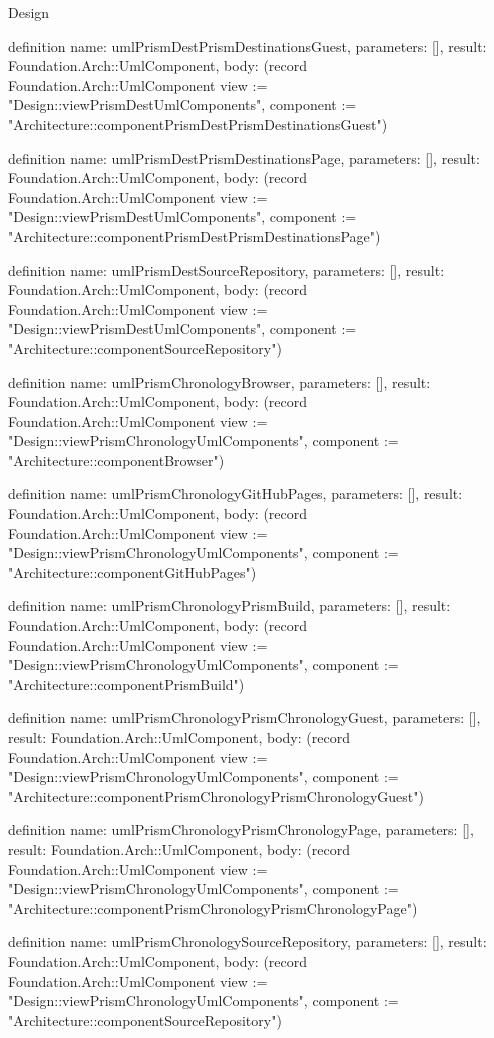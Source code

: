 \begin{lexlean}{Design}
\begin{semanticmodule}
definition{
  name: umlPrismDestPrismDestinationsGuest,
  parameters: [],
  result: Foundation.Arch::UmlComponent,
  body: (record Foundation.Arch::UmlComponent {view := "Design::viewPrismDestUmlComponents", component := "Architecture::componentPrismDestPrismDestinationsGuest"})
}

definition{
  name: umlPrismDestPrismDestinationsPage,
  parameters: [],
  result: Foundation.Arch::UmlComponent,
  body: (record Foundation.Arch::UmlComponent {view := "Design::viewPrismDestUmlComponents", component := "Architecture::componentPrismDestPrismDestinationsPage"})
}

definition{
  name: umlPrismDestSourceRepository,
  parameters: [],
  result: Foundation.Arch::UmlComponent,
  body: (record Foundation.Arch::UmlComponent {view := "Design::viewPrismDestUmlComponents", component := "Architecture::componentSourceRepository"})
}

definition{
  name: umlPrismChronologyBrowser,
  parameters: [],
  result: Foundation.Arch::UmlComponent,
  body: (record Foundation.Arch::UmlComponent {view := "Design::viewPrismChronologyUmlComponents", component := "Architecture::componentBrowser"})
}

definition{
  name: umlPrismChronologyGitHubPages,
  parameters: [],
  result: Foundation.Arch::UmlComponent,
  body: (record Foundation.Arch::UmlComponent {view := "Design::viewPrismChronologyUmlComponents", component := "Architecture::componentGitHubPages"})
}

definition{
  name: umlPrismChronologyPrismBuild,
  parameters: [],
  result: Foundation.Arch::UmlComponent,
  body: (record Foundation.Arch::UmlComponent {view := "Design::viewPrismChronologyUmlComponents", component := "Architecture::componentPrismBuild"})
}

definition{
  name: umlPrismChronologyPrismChronologyGuest,
  parameters: [],
  result: Foundation.Arch::UmlComponent,
  body: (record Foundation.Arch::UmlComponent {view := "Design::viewPrismChronologyUmlComponents", component := "Architecture::componentPrismChronologyPrismChronologyGuest"})
}

definition{
  name: umlPrismChronologyPrismChronologyPage,
  parameters: [],
  result: Foundation.Arch::UmlComponent,
  body: (record Foundation.Arch::UmlComponent {view := "Design::viewPrismChronologyUmlComponents", component := "Architecture::componentPrismChronologyPrismChronologyPage"})
}

definition{
  name: umlPrismChronologySourceRepository,
  parameters: [],
  result: Foundation.Arch::UmlComponent,
  body: (record Foundation.Arch::UmlComponent {view := "Design::viewPrismChronologyUmlComponents", component := "Architecture::componentSourceRepository"})
}


\end{semanticmodule}
\end{lexlean}
